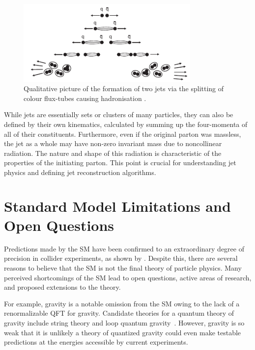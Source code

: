 \begin{figure}[h]
    \centering
    \includegraphics[width=0.8\textwidth]{Figures/standard_model/hadronisation.pdf}
    \caption{Qualitative picture of the formation of two jets via the splitting of colour flux-tubes causing hadronisation \cite{ModernParticlePhysics}.}
    \label{fig:hadronisation}
\end{figure}

While jets are essentially sets or clusters of many particles, they can also be defined by their own kinematics, calculated by summing up the four-momenta of all of their constituents.
Furthermore, even if the original parton was massless, the jet as a whole may have non-zero invariant mass due to noncollinear radiation.
The nature and shape of this radiation is characteristic of the properties of the initiating parton.
This point is crucial for understanding jet physics and defining jet reconstruction algorithms.

\section{Standard Model Limitations and Open Questions}
\label{sec:sm_limitations}

Predictions made by the SM have been confirmed to an extraordinary degree of precision in collider experiments, as shown by .
Despite this, there are several reasons to believe that the SM is not the final theory of particle physics.
Many perceived shortcomings of the SM lead to open questions, active areas of research, and proposed extensions to the theory.

For example, gravity is a notable omission from the SM owing to the lack of a renormalizable QFT for gravity.
Candidate theories for a quantum theory of gravity include string theory and loop quantum gravity~\cite{GravityQFT}.
However, gravity is so weak that it is unlikely a theory of quantized gravity could even make testable predictions at the energies accessible by current experiments.

